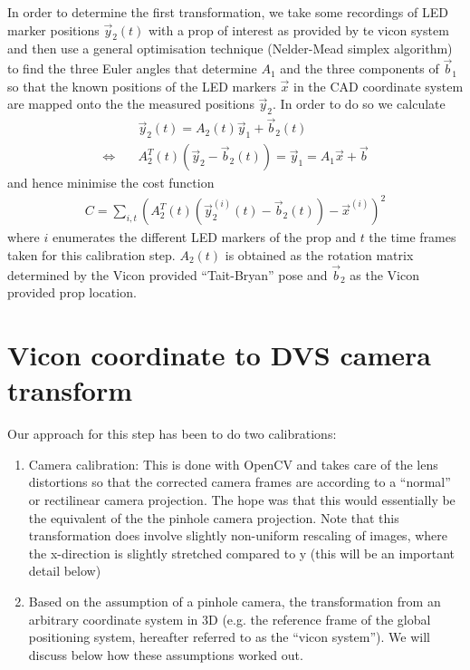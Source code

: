 \documentclass{article}
\begin{document}
In order to determine the first transformation, we take some
recordings of LED marker positions $\vec{y}_2(t)$ with a prop of
interest as provided by te vicon system and then
use a general optimisation technique (Nelder-Mead simplex algorithm)
to find the three Euler angles that determine $A_1$ and the three components of
$\vec{b}_1$ so that the known positions of the LED markers $\vec{x}$ in the CAD
coordinate system are mapped onto the the measured positions
$\vec{y}_2$. In order to do so we calculate
\begin{align}
  & \vec{y}_2(t) = A_2(t) \vec{y}_1 + \vec{b}_2(t) \\
  \Leftrightarrow \quad & A_2^T(t) (\vec{y}_2 - \vec{b}_2(t)) = \vec{y}_1 =
  A_1 \vec{x} +\vec{b}
\end{align}
and hence minimise the cost function
\begin{align}
  C= \sum_{i,t} \left(A_2^T(t) (\vec{y}_2^{(i)}(t) - \vec{b}_2(t)) -
  \vec{x}^{(i)}\right)^2
\end{align}
where $i$ enumerates the different LED markers of the prop and $t$ the
time frames taken for this calibration step. $A_2(t)$ is obtained as
the rotation matrix determined by the Vicon provided ``Tait-Bryan''
pose and $\vec{b}_2$ as the Vicon provided prop location.

\section{Vicon coordinate to DVS camera transform}
Our approach for this step has been to do two calibrations:
\begin{enumerate}
\item Camera calibration: This is done with OpenCV and takes care of the lens distortions so that the corrected camera frames are according to a ``normal'' or rectilinear camera projection. The hope was that this would essentially be the equivalent of the the pinhole camera projection. Note that this transformation does involve slightly non-uniform rescaling of images, where the x-direction is slightly stretched compared to y (this will be an important detail below)
\item Based on the assumption of a pinhole camera, the transformation from an arbitrary coordinate system in 3D (e.g. the reference frame of the global positioning system, hereafter referred to as the ``vicon system''). We will discuss below how these assumptions worked out.
\end{enumerate}
\end{document}
